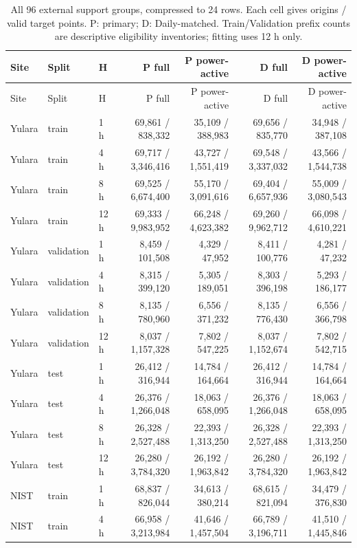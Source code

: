 \begin{longtable}{lllrrrr}
\caption{All 96 external support groups, compressed to 24 rows. Each cell gives origins / valid target points. P: primary; D: Daily-matched. Train/Validation prefix counts are descriptive eligibility inventories; fitting uses 12 h only.}\label{tabs:externalcounts}\\
\toprule Site & Split & H & P full & P power-active & D full & D power-active\\\midrule
\endfirsthead\toprule Site & Split & H & P full & P power-active & D full & D power-active\\\midrule\endhead
Yulara & train & 1 h & 69,861 / 838,332 & 35,109 / 388,983 & 69,656 / 835,770 & 34,948 / 387,108\\
Yulara & train & 4 h & 69,717 / 3,346,416 & 43,727 / 1,551,419 & 69,548 / 3,337,032 & 43,566 / 1,544,738\\
Yulara & train & 8 h & 69,525 / 6,674,400 & 55,170 / 3,091,616 & 69,404 / 6,657,936 & 55,009 / 3,080,543\\
Yulara & train & 12 h & 69,333 / 9,983,952 & 66,248 / 4,623,382 & 69,260 / 9,962,712 & 66,098 / 4,610,221\\
Yulara & validation & 1 h & 8,459 / 101,508 & 4,329 / 47,952 & 8,411 / 100,776 & 4,281 / 47,232\\
Yulara & validation & 4 h & 8,315 / 399,120 & 5,305 / 189,051 & 8,303 / 396,198 & 5,293 / 186,177\\
Yulara & validation & 8 h & 8,135 / 780,960 & 6,556 / 371,232 & 8,135 / 776,430 & 6,556 / 366,798\\
Yulara & validation & 12 h & 8,037 / 1,157,328 & 7,802 / 547,225 & 8,037 / 1,152,674 & 7,802 / 542,715\\
Yulara & test & 1 h & 26,412 / 316,944 & 14,784 / 164,664 & 26,412 / 316,944 & 14,784 / 164,664\\
Yulara & test & 4 h & 26,376 / 1,266,048 & 18,063 / 658,095 & 26,376 / 1,266,048 & 18,063 / 658,095\\
Yulara & test & 8 h & 26,328 / 2,527,488 & 22,393 / 1,313,250 & 26,328 / 2,527,488 & 22,393 / 1,313,250\\
Yulara & test & 12 h & 26,280 / 3,784,320 & 26,192 / 1,963,842 & 26,280 / 3,784,320 & 26,192 / 1,963,842\\
NIST & train & 1 h & 68,837 / 826,044 & 34,613 / 380,214 & 68,615 / 821,094 & 34,479 / 376,830\\
NIST & train & 4 h & 66,958 / 3,213,984 & 41,646 / 1,457,504 & 66,789 / 3,196,711 & 41,510 / 1,445,846\\

\end{longtable}
